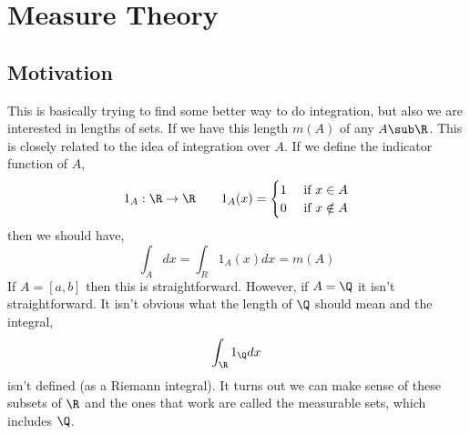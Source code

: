 \section{Measure Theory}
\subsection{Motivation}
This is basically trying to find some better way to do integration, but also we are interested in lengths of sets. If we have this length $m(A)$ of any $A \sub \R$. This is closely related to the idea of integration over $A$. If we define the indicator function of $A$,
$$ 1_A : \R \to \R \qquad 1_A(x) = \begin{cases}
  1 & \text{ if } x \in A \\
  0 & \text{ if } x \notin A
\end{cases} $$
then we should have,
$$ \int_A dx = \int_R 1_A(x)dx = m(A) $$
If $A = [a, b]$ then this is straightforward. However, if $A = \Q$ it isn't straightforward. It isn't obvious what the length of $\Q$ should mean and the integral,
$$ \int_\R 1_\Q dx $$
isn't defined (as a Riemann integral). It turns out we can make sense of these subsets of $\R$ and the ones that work are called the measurable sets, which includes $\Q$. \\

